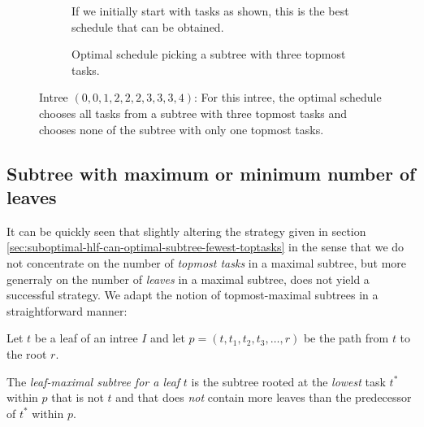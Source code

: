 \begin{figure}[ht]
  \centering
  \begin{subfigure}{.45\textwidth}
    \centering
    
    \caption{If we initially start with tasks as shown, this is the best schedule that can be obtained.}
  \end{subfigure}
  \quad
  \begin{subfigure}{.45\textwidth}
    \centering
    
    \caption{Optimal schedule picking a subtree with three topmost tasks.}
  \end{subfigure}
\caption{Intree $(0,0,1,2,2,2,3,3,3,4)$: For this intree, the optimal schedule chooses all tasks from a subtree with three topmost tasks and chooses none of the subtree with only one topmost tasks.}
  \label{fig:subtree-with-fewest-toptasks-suboptimal}
\end{figure}

\subsection{Subtree with maximum or minimum number of leaves}
\label{sec:suboptimal-hlf-can-optimal-subtree-fewest-leaves}

It can be quickly seen that slightly altering the strategy given in section \ref{sec:suboptimal-hlf-can-optimal-subtree-fewest-toptasks} in the sense that we do not concentrate on the number of \emph{topmost tasks} in a maximal subtree, but more generraly on the number of \emph{leaves} in a maximal subtree, does not yield a successful strategy. We adapt the notion of topmost-maximal subtrees in a straightforward manner:

\begin{definition}
  Let $t$ be a leaf of an intree $I$ and let $p=(t, t_1, t_2, t_3, \dots, r)$ be the path from $t$ to the root $r$.

  The \emph{leaf-maximal subtree for a leaf} $t$ is the subtree rooted at the \emph{lowest} task $t^*$ within $p$ that is not $t$ and that does \emph{not} contain more leaves than the predecessor of $t^*$ within $p$.
\end{definition}

